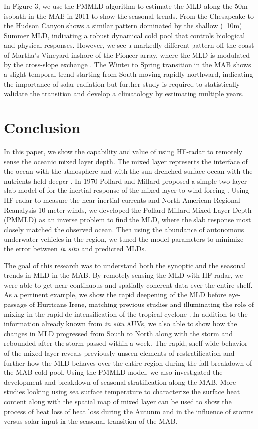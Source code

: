\documentclass{article}
\begin{document}
In Figure 3, we use the PMMLD algorithm to estimate the MLD along the 50m isobath in the MAB in 2011 to show the seasonal trends.
From the Chesapeake to the Hudson Canyon shows a similar pattern dominated by the shallow (~10m) Summer MLD, indicating a robust dynamical cold pool that controls biological and physical responses. 
However, we see a markedly different pattern off the coast of Martha's Vineyard inshore of the Pioneer array, where the MLD is modulated by the cross-slope exchange \cite{gawarkiewicz2018changing}.
The Winter to Spring transition in the MAB shows a slight temporal trend starting from South moving rapidly northward, indicating the importance of solar radiation but further study is required to statistically validate the transition and develop a climatology by estimating multiple years.

\section*{Conclusion}
In this paper, we show the capability and value of using HF-radar to remotely sense the oceanic mixed layer depth.
The mixed layer represents the interface of the ocean with the atmosphere and with the sun-drenched surface ocean with the nutrients held deeper \cite{taylor2011ocean}. 
In 1970 Pollard and Millard proposed a simple two-layer slab model of for the inertial response of the mixed layer to wind forcing \cite{Pollard1970a,Pollard1970}. 
Using HF-radar to measure the near-inertial currents and North American Regional Reanalysis 10-meter winds, we developed the Pollard-Millard Mixed Layer Depth (PMMLD) as an inverse problem to find the MLD, where the slab response most closely matched the observed ocean.
Then using the abundance of autonomous underwater vehicles in the region, we tuned the model parameters to minimize the error between \textit{in situ} and predicted MLDs. 

The goal of this research was to understand both the synoptic and the seasonal trends in MLD in the MAB. 
By remotely sensing the MLD with HF-radar, we were able to get near-continuous and spatially coherent data over the entire shelf. 
As a pertinent example, we show the rapid deepening of the MLD before eye-passage of Hurricane Irene, matching previous studies and illuminating the role of mixing in the rapid de-intensification of the tropical cyclone \cite{Seroka2016}.
In addition to the information already known from \textit{in situ} AUVs, we also able to show how the changes in MLD progressed from South to North along with the storm and rebounded after the storm passed within a week.
The rapid, shelf-wide behavior of the mixed layer reveals previously unseen elements of restratification and further how the MLD behaves over the entire region during the fall breakdown of the MAB cold pool.
Using the PMMLD model, we also investigated the development and breakdown of seasonal stratification along the MAB.
More studies looking using sea surface temperature to characterize the surface heat content along with the spatial map of mixed layer can be used to show the process of heat loss of heat loss during the Autunm and in the influence of storms versus solar input in the seasonal transition of the MAB. 



\newpage
\singlespacing
\printbibliography


 
\end{document}
